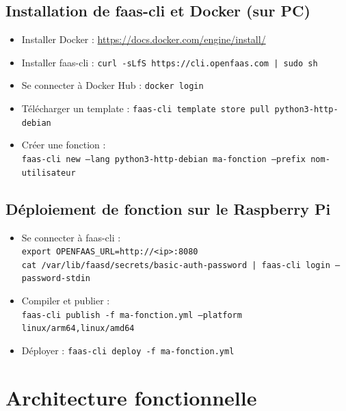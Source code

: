 \documentclass[a4paper,11pt]{article}
\begin{document}
	\subsection{Installation de faas-cli et Docker (sur PC)}
	\begin{itemize}
		\item Installer Docker : \url{https://docs.docker.com/engine/install/}
		\item Installer faas-cli : \texttt{curl -sLfS https://cli.openfaas.com | sudo sh}
		\item Se connecter à Docker Hub : \texttt{docker login}
		\item Télécharger un template : \texttt{faas-cli template store pull python3-http-debian}
		\item Créer une fonction :\\
		\texttt{faas-cli new --lang python3-http-debian ma-fonction --prefix nom-utilisateur}
	\end{itemize}
	
	\subsection{Déploiement de fonction sur le Raspberry Pi}
	\begin{itemize}
		\item Se connecter à faas-cli :\\
		\texttt{export OPENFAAS\_URL=http://<ip>:8080} \\
		\texttt{cat /var/lib/faasd/secrets/basic-auth-password | faas-cli login --password-stdin}
		\item Compiler et publier :\\
		\texttt{faas-cli publish -f ma-fonction.yml --platform linux/arm64,linux/amd64}
		\item Déployer : \texttt{faas-cli deploy -f ma-fonction.yml}
	\end{itemize}
	
	\section{Architecture fonctionnelle}

	
\end{document}
